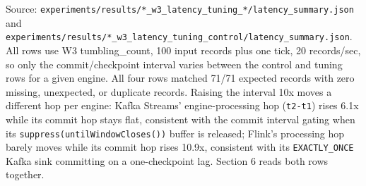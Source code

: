 Source:
\texttt{experiments/results/*\_w3\_latency\_tuning\_*/latency\_summary.json}
and
\texttt{experiments/results/*\_w3\_latency\_tuning\_control/latency\_summary.json}.
All rows use W3 tumbling\_count, 100 input records plus one tick, 20
records/sec, so only the commit/checkpoint interval varies between the
control and tuning rows for a given engine. All four rows matched 71/71
expected records with zero missing, unexpected, or duplicate records.
Raising the interval 10x moves a different hop per engine: Kafka
Streams' engine-processing hop (\texttt{t2-t1}) rises 6.1x while its
commit hop stays flat, consistent with the commit interval gating when
its \texttt{suppress(untilWindowCloses())} buffer is released; Flink's
processing hop barely moves while its commit hop rises 10.9x, consistent
with its \texttt{EXACTLY\_ONCE} Kafka sink committing on a
one-checkpoint lag. Section 6 reads both rows together.

